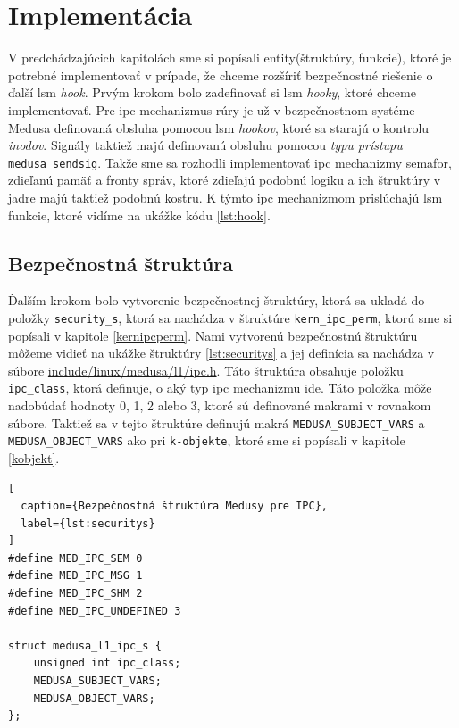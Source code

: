 \section{Implementácia}
V predchádzajúcich kapitolách sme si popísali entity(štruktúry, funkcie), ktoré je potrebné implementovať v prípade, že chceme rozšíriť bezpečnostné riešenie o ďalší \acrshort{lsm} \textit{hook}. Prvým krokom bolo zadefinovať si \acrshort{lsm} \textit{hooky}, ktoré chceme implementovať. Pre \acrshort{ipc} mechanizmus rúry je už v bezpečnostnom systéme Medusa definovaná obsluha pomocou \acrshort{lsm} \textit{hookov}, ktoré sa starajú o kontrolu \textit{inodov}. Signály taktiež majú definovanú obsluhu pomocou \textit{typu prístupu} \texttt{medusa\_sendsig}. Takže sme sa rozhodli implementovať \acrshort{ipc} mechanizmy semafor, zdieľanú pamäť a fronty správ, ktoré zdieľajú podobnú logiku a ich štruktúry v jadre majú taktiež podobnú kostru. K týmto \acrshort{ipc} mechanizmom prislúchajú \acrshort{lsm} funkcie, ktoré vidíme na ukážke kódu \ref{lst:hook}. 
\subsection{Bezpečnostná štruktúra} \label{securitys}
Ďalším krokom bolo vytvorenie bezpečnostnej štruktúry, ktorá sa ukladá do položky \texttt{security\_s}, ktorá sa nachádza v štruktúre \texttt{kern\_ipc\_perm}, ktorú sme si popísali v kapitole \ref{kernipcperm}. Nami vytvorenú bezpečnostnú štruktúru môžeme vidieť na ukážke štruktúry \ref{lst:securitys} a  jej definícia sa nachádza v súbore \url{include/linux/medusa/l1/ipc.h}. Táto štruktúra obsahuje položku \texttt{ipc\_class}, ktorá definuje, o aký typ \acrshort{ipc} mechanizmu ide. Táto položka môže nadobúdať hodnoty 0, 1, 2 alebo 3, ktoré sú definované makrami v rovnakom súbore. Taktiež sa v tejto štruktúre definujú makrá \texttt{MEDUSA\_SUBJECT\_VARS} a \texttt{MEDUSA\_OBJECT\_VARS} ako pri \texttt{k-objekte}, ktoré sme si popísali v kapitole \ref{kobjekt}. 
\begin{lstlisting}[
  caption={Bezpečnostná štruktúra Medusy pre IPC},
  label={lst:securitys}
]
#define MED_IPC_SEM 0
#define MED_IPC_MSG 1
#define MED_IPC_SHM 2
#define MED_IPC_UNDEFINED 3

struct medusa_l1_ipc_s {
	unsigned int ipc_class;
	MEDUSA_SUBJECT_VARS;
	MEDUSA_OBJECT_VARS;
};
\end{lstlisting} 

